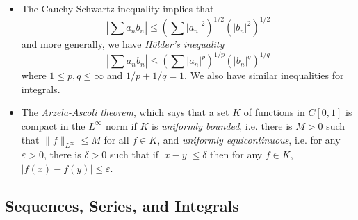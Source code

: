 \documentclass{exam}
\theoremstyle{problemstyle}
\newcommand{\1}[1]{\textbf{1}_{\left[#1\right]}} %
\begin{document}
\begin{itemize}
	\item The Cauchy-Schwartz inequality implies that
	\[ | \sum a_n b_n | \leq \left( \sum |a_n|^2 \right)^{1/2} \left( |b_n|^2 \right)^{1/2} \]
	and more generally, we have \emph{H\"{o}lder's inequality}
	\[ | \sum a_n b_n | \leq \left( \sum |a_n|^p \right)^{1/p} \left( |b_n|^q \right)^{1/q} \]
	where $1 \leq p,q \leq \infty$ and $1/p + 1/q = 1$. We also have similar inequalities for integrals.

	\item The \emph{Arzela-Ascoli theorem}, which says that a set $K$ of functions in $C[0,1]$ is compact in the $L^\infty$ norm if $K$ is \emph{uniformly bounded}, i.e. there is $M > 0$ such that $\| f \|_{L^\infty} \leq M$ for all $f \in K$, and \emph{uniformly equicontinuous}, i.e. for any $\varepsilon > 0$, there is $\delta > 0$ such that if $|x - y| \leq \delta$ then for any $f \in K$, $|f(x) - f(y)| \leq \varepsilon$.
\end{itemize}

\subsection*{Sequences, Series, and Integrals}
\end{document}

